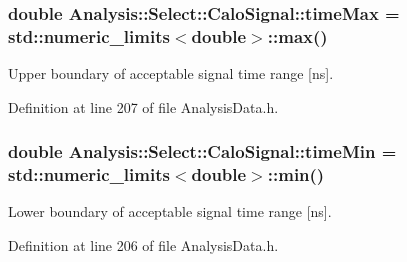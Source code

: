 \subsubsection[{\texorpdfstring{time\+Max}{timeMax}}]{\setlength{\rightskip}{0pt plus 5cm}double Analysis\+::\+Select\+::\+Calo\+Signal\+::time\+Max = std\+::numeric\+\_\+limits$<$double$>$\+::max()\hspace{0.3cm}{\ttfamily [static]}}\hypertarget{namespaceAnalysis_1_1Select_1_1CaloSignal_a74dfc4bcd69d76f68f67e638a3b26e67}{}\label{namespaceAnalysis_1_1Select_1_1CaloSignal_a74dfc4bcd69d76f68f67e638a3b26e67}


Upper boundary of acceptable signal time range \mbox{[}ns\mbox{]}. 



Definition at line 207 of file Analysis\+Data.\+h.

\subsubsection[{\texorpdfstring{time\+Min}{timeMin}}]{\setlength{\rightskip}{0pt plus 5cm}double Analysis\+::\+Select\+::\+Calo\+Signal\+::time\+Min = std\+::numeric\+\_\+limits$<$double$>$\+::min()\hspace{0.3cm}{\ttfamily [static]}}\hypertarget{namespaceAnalysis_1_1Select_1_1CaloSignal_abeb7a2c3395cdb72a38f5834405bf805}{}\label{namespaceAnalysis_1_1Select_1_1CaloSignal_abeb7a2c3395cdb72a38f5834405bf805}


Lower boundary of acceptable signal time range \mbox{[}ns\mbox{]}. 



Definition at line 206 of file Analysis\+Data.\+h.

